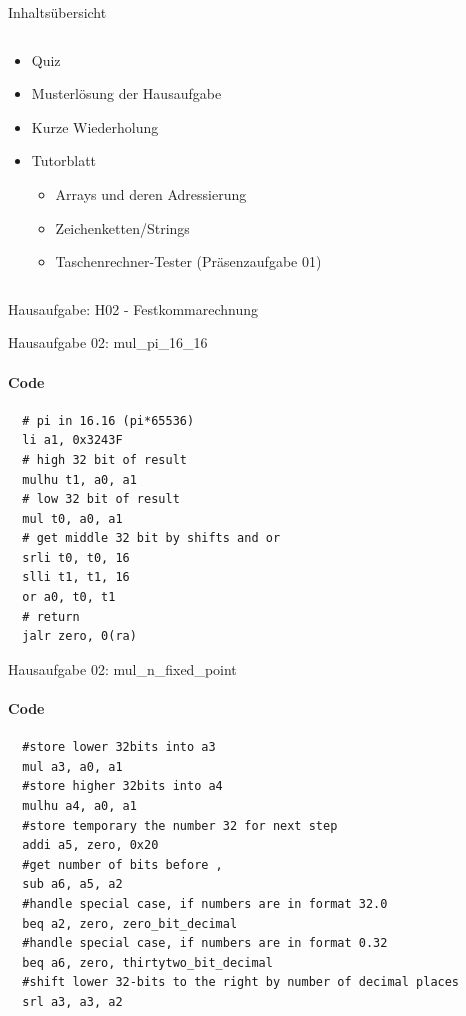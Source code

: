 \documentclass[
  german,            %
  aspectratio=169,    %
]{tumbeamer}
\begin{document}
\begin{frame}[c]{Inhaltsübersicht}{}
  \begin{columns}[c]
    \begin{column}{1\textwidth}
      \begin{itemize}
        \item Quiz
        \item Musterlösung der Hausaufgabe
        \item Kurze Wiederholung
        \item Tutorblatt
        \begin{itemize}
          \item Arrays und deren Adressierung
          \item Zeichenketten/Strings
          \item Taschenrechner-Tester (Präsenzaufgabe 01)
        \end{itemize}
      \end{itemize}
    \end{column}
  \end{columns}
\end{frame}

\begin{frame}[c]{}{}
  \begin{center}
    \LARGE Hausaufgabe: H02 - Festkommarechnung
  \end{center}
\end{frame}

\begin{frame}[fragile]{Hausaufgabe 02: mul\_pi\_16\_16}
  \framesubtitle{Code}
  \begin{lstlisting}
  # pi in 16.16 (pi*65536)
  li a1, 0x3243F
  # high 32 bit of result
  mulhu t1, a0, a1
  # low 32 bit of result
  mul t0, a0, a1
  # get middle 32 bit by shifts and or
  srli t0, t0, 16
  slli t1, t1, 16
  or a0, t0, t1
  # return
  jalr zero, 0(ra)
  \end{lstlisting}
\end{frame}

\begin{frame}[fragile]{Hausaufgabe 02: mul\_n\_fixed\_point}
  \framesubtitle{Code}
  \begin{lstlisting}
  #store lower 32bits into a3
  mul a3, a0, a1
  #store higher 32bits into a4
  mulhu a4, a0, a1
  #store temporary the number 32 for next step
  addi a5, zero, 0x20
  #get number of bits before ,
  sub a6, a5, a2
  #handle special case, if numbers are in format 32.0
  beq a2, zero, zero_bit_decimal
  #handle special case, if numbers are in format 0.32
  beq a6, zero, thirtytwo_bit_decimal
  #shift lower 32-bits to the right by number of decimal places
  srl a3, a3, a2
  \end{lstlisting}
\end{frame}
\end{document}
